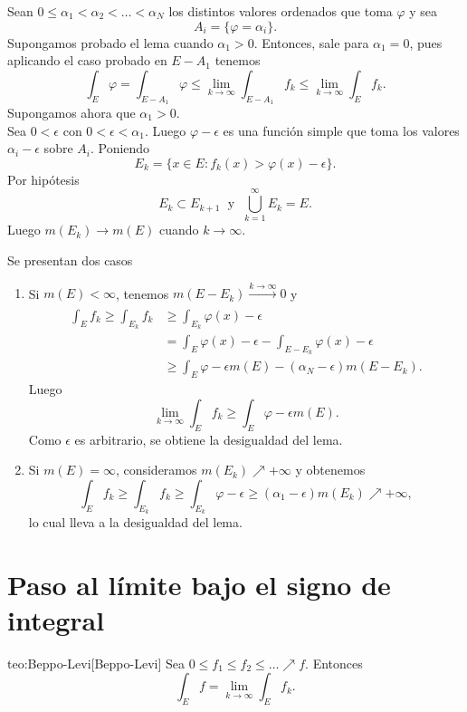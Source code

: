 \begin{demo}
Sean $0\leq \alpha_1< \alpha_2<\ldots < \alpha_N$ los distintos valores ordenados que toma $\varphi$ y sea 
\[  
A_i=\{\varphi=\alpha_i\}.
\]
Supongamos probado el lema cuando $\alpha_1>0$. Entonces, sale para $\alpha_1=0$, pues aplicando el caso probado en $E-A_1$ tenemos 
\[
\int_E \varphi =\int_{E-A_1}\varphi 
\leq \lim\limits_{k\to \infty} \int_{E-A_1} f_k
\leq \lim\limits_{k \to \infty} \int_E f_k.
\]
Supongamos ahora que $\alpha_1>0$.\\ Sea $0<\epsilon$ con $0<\epsilon<\alpha_1$.
Luego $\varphi-\epsilon$ es una funci\'on simple que toma los valores $\alpha_i-\epsilon$ sobre $A_i$. 
Poniendo 
\[
E_k=\{x\in E: f_k(x)> \varphi (x)-\epsilon \}.
\]
Por hip\'otesis
\[
E_k \subset E_{k+1}  \;\mbox { y }\; \bigcup\limits_{k=1}^{\infty}E_k
=E.\]
Luego $m(E_k) \to m(E)$ cuando $k \to \infty$.

Se presentan dos casos
\begin{enumerate}
    \item Si $m(E)<\infty$, tenemos $m(E-E_k) \xrightarrow[]{k \to \infty}0$
     y 
    \[
    \begin{split}
    \int_E f_k \geq \int_{E_k} f_k &\geq \int_{E_k} \varphi(x) -\epsilon
    \\
    &=\int_E \varphi(x)-\epsilon -\int_{E-E_k}\varphi(x)-\epsilon
    \\
    &\geq \int_E \varphi -\epsilon m(E)-(\alpha_N-\epsilon)m(E-E_k).
    \end{split}
         \]
    Luego 
    \[
    \lim\limits_{k \to \infty} \int_E f_k \geq \int_E \varphi-\epsilon m(E).
    \]
    Como $\epsilon$ es arbitrario, se obtiene la desigualdad del lema.
    \item Si $m(E)=\infty$, consideramos $m(E_k)\nearrow +\infty$
    y obtenemos
    \[
    \int_E f_k \geq \int_{E_k} f_k 
    \geq \int_{E_k} \varphi-\epsilon \geq (\alpha_1-\epsilon)m(E_k)\nearrow +\infty, 
    \]
    lo cual lleva a la desigualdad del lema.
\end{enumerate}
\end{demo}

\section{Paso al l\'imite bajo el signo de integral}

\begin{teorema}{teo:Beppo-Levi}[Beppo-Levi]
Sea $0\leq f_1\leq f_2\leq\ldots \nearrow f$. 
Entonces
\[ \int_E f =
\lim\limits_{k \to \infty} \int_E f_k.\]
\end{teorema}
    

